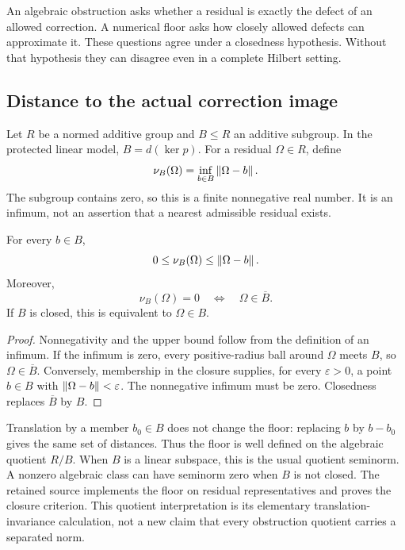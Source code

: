 \clearpage
{}\label{sec:floor}
An algebraic obstruction asks whether a residual is exactly the defect of an allowed correction. A numerical floor asks how closely allowed defects can approximate it. These questions agree under a closedness hypothesis. Without that hypothesis they can disagree even in a complete Hilbert setting.

\subsection{Distance to the actual correction image}
Let \(R\) be a normed additive group and \(B\le R\) an additive subgroup. In the protected linear model, \(B=d(\ker p)\). For a residual \(\Omega\in R\), define
\[
 \nu_B(\Omega)=\inf_{b\in B}\left\lVert\Omega-b\right\rVert.
\]
The subgroup contains zero, so this is a finite nonnegative real number. It is an infimum, not an assertion that a nearest admissible residual exists.

\begin{proposition}\label{KS76}
For every \(b\in B\),
\[
 0\le\nu_B(\Omega)\le\left\lVert\Omega-b\right\rVert.
\]
Moreover,
\[
 \nu_B(\Omega)=0\quad\Longleftrightarrow\quad\Omega\in\overline B.
\]
If \(B\) is closed, this is equivalent to \(\Omega\in B\).
\end{proposition}
\begin{proof}
Nonnegativity and the upper bound follow from the definition of an infimum. If the infimum is zero, every positive-radius ball around \(\Omega\) meets \(B\), so \(\Omega\in\overline B\). Conversely, membership in the closure supplies, for every \(\varepsilon>0\), a point \(b\in B\) with \(\left\lVert\Omega-b\right\rVert<\varepsilon\). The nonnegative infimum must be zero. Closedness replaces \(\overline B\) by \(B\).
\end{proof}
Translation by a member \(b_0\in B\) does not change the floor: replacing \(b\) by \(b-b_0\) gives the same set of distances. Thus the floor is well defined on the algebraic quotient \(R/B\). When \(B\) is a linear subspace, this is the usual quotient seminorm. A nonzero algebraic class can have seminorm zero when \(B\) is not closed. The retained source implements the floor on residual representatives and proves the closure criterion. This quotient interpretation is its elementary translation-invariance calculation, not a new claim that every obstruction quotient carries a separated norm.

